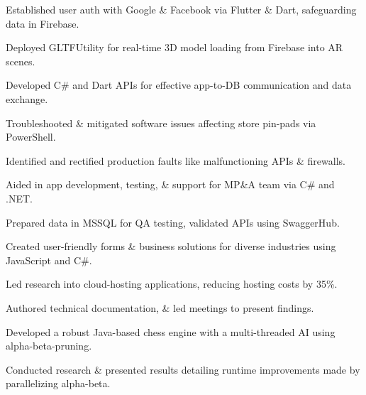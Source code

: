 \documentclass[]{deedy-resume-openfont}
\begin{document}
\begin{tightemize}
\item Established user auth with Google \& Facebook via Flutter \& Dart, safeguarding data in Firebase.
\item Deployed GLTFUtility for real-time 3D model loading from Firebase into AR scenes.
\item Developed C\# and Dart APIs for effective app-to-DB communication and data exchange.
\end{tightemize}
\sectionsep

\begin{tightemize}
\item Troubleshooted \& mitigated software issues affecting store pin-pads via PowerShell.
\item Identified and rectified production faults like malfunctioning APIs \& firewalls.
\item Aided in app development, testing, \& support for MP\&A team via C\# and .NET.
\item Prepared data in MSSQL for QA testing, validated APIs using SwaggerHub.
\end{tightemize}
\sectionsep

\begin{tightemize}
\item Created user-friendly forms \& business solutions for diverse industries using JavaScript and C\#.
\item Led research into cloud-hosting applications, reducing hosting costs by 35\%.
\item Authored technical documentation, \& led meetings to present findings.
\end{tightemize}




\begin{tightemize}
\item Developed a robust Java-based chess engine with a multi-threaded AI using alpha-beta-pruning. 
\item Conducted research \& presented results detailing runtime improvements made by parallelizing alpha-beta.
\end{tightemize}
\sectionsep
\end{document}
